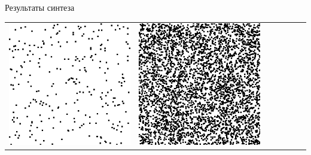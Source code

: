 \documentclass[12pt]{beamer}
\begin{document}
\begin{frame}{Результаты синтеза}
\begin{table}
\begin{center}
\begin{tabular}{p{1.2cm} p{1.2cm} p{1.2cm} p{1.2cm} p{1.2cm} p{1.2cm} p{1.2cm}}
					\includegraphics[width=1\linewidth]{8-results/sand-trend8/left3}
					&
					\includegraphics[width=1\linewidth]{8-results/sand-trend8/right3}
					&

\end{tabular}
\end{center}
\end{table}
\end{frame}
\end{document}
